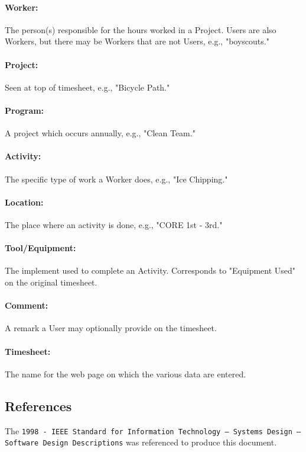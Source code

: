 \documentclass[12pt]{article}
\begin{document}
\paragraph{Worker:} The person(s) responsible for the hours worked in a Project. Users are also Workers, but there may be Workers that are not Users, e.g., "boyscouts."
\paragraph{Project:} Seen at top of timesheet, e.g., "Bicycle Path."
\paragraph{Program:} A project which occurs annually, e.g., "Clean Team."
\paragraph{Activity:} The specific type of work a Worker does, e.g., "Ice Chipping."
\paragraph{Location:} The place where an activity is done, e.g., "CORE 1st - 3rd."
\paragraph{Tool/Equipment:} The implement used to complete an Activity. Corresponds to "Equipment Used" on the original timesheet.
\paragraph{Comment:} A remark a User may optionally provide on the timesheet.
\paragraph{Timesheet:} The name for the web page on which the various data are entered.

\subsection{References}
The {\tt 1998 - IEEE Standard for Information Technology -- Systems Design -- Software Design Descriptions} was referenced to produce this document.
\end{document}
